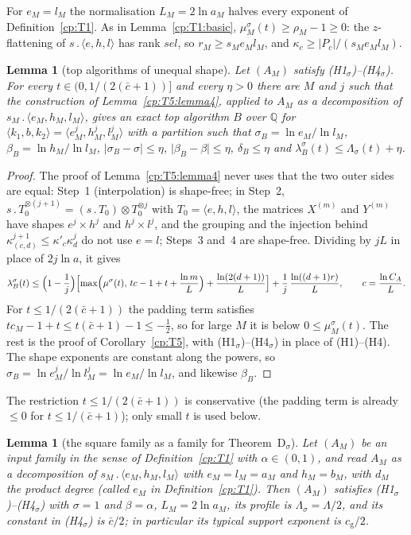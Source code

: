 \documentclass[11pt]{article}
\newtheorem{lemma}[theorem]{Lemma}
\theoremstyle{definition}
\theoremstyle{remark}
\providecommand{\Q}{\mathbb{Q}}
\newcommand{\abs}[1]{\lvert #1\rvert}
\newcommand{\mat}[3]{\langle #1,#2,#3\rangle} %
\newcommand{\cp}{\mathbin{.}}                 %
\newcommand{\delB}{\delta_B}                  %
\newcommand{\Lam}{\Lambda}                    %
\newcommand{\cg}{c_{\mathrm g}}               %
\newcommand{\cbar}{\bar c}                    %
\newcommand{\Hcond}[1]{\textup{(H#1)}}        %
\newcommand{\Hscond}[1]{\textup{(H#1$_\sigma$)}} %
\newcommand{\ThmDsig}{Theorem~D\texorpdfstring{\ensuremath{_\sigma}}{\_sigma}}   %
\begin{document}
For $e_M=l_M$ the normalisation $L_M=2\ln a_M$ halves every exponent of Definition~\ref{cp:T1}. As in Lemma~\ref{cp:T1:basic}, $\mu^\sigma_M(t)\ge\rho_M-1\ge0$: the $z$-flattening of $s\cp\mat ehl$ has rank $sel$, so $r_M\ge s_Me_Ml_M$, and $\kappa_c\ge\abs{P_c}/(s_Me_Ml_M)$.

\begin{lemma}[top algorithms of unequal shape]\label{cp:E3:top}
Let $(A_M)$ satisfy \Hscond1--\Hscond4. For every $t\in(0,1/(2(\cbar+1))]$ and every $\eta>0$ there are $M$ and $j$ such that the construction of Lemma~\ref{cp:T5:lemma4}, applied to $A_M$ as a decomposition of $s_M\cp\mat{e_M}{h_M}{l_M}$, gives an exact top algorithm $B$ over $\Q$ for $\mat{k_1}b{k_2}=\mat{e_M^j}{h_M^j}{l_M^j}$ with a partition such that $\sigma_B=\ln e_M/\ln l_M$, $\beta_B=\ln h_M/\ln l_M$, $\abs{\sigma_B-\sigma}\le\eta$, $\abs{\beta_B-\beta}\le\eta$, $\delB\le\eta$ and $\lambda^\sigma_B(t)\le\Lam_\sigma(t)+\eta$.
\end{lemma}

\begin{proof}
The proof of Lemma~\ref{cp:T5:lemma4} never uses that the two outer sides are equal: Step~1 (interpolation) is shape-free; in Step~2, $s\cp T_0^{\otimes(j+1)}=(s\cp T_0)\otimes T_0^{\otimes j}$ with $T_0=\mat ehl$, the matrices $X^{(m)}$ and $Y^{(m)}$ have shapes $e^j\times h^j$ and $h^j\times l^j$, and the grouping and the injection behind $\kappa^{j+1}_{(c,d)}\le\kappa'_c\kappa^j_d$ do not use $e=l$; Steps~3 and~4 are shape-free. Dividing by $jL$ in place of $2j\ln a$, it gives
\[
\lambda^\sigma_B(t)\le\Bigl(1-\frac1j\Bigr)\Bigl[\max\Bigl(\mu^\sigma(t),\,tc-1+t+\frac{\ln m}L\Bigr)+\frac{\ln(2(d+1))}L\Bigr]+\frac1j\,\frac{\ln((d+1)r)}L,\qquad c=\frac{\ln C_A}L .
\]
For $t\le1/(2(\cbar+1))$ the padding term satisfies $tc_M-1+t\le t(\cbar+1)-1\le-\frac12$, so for large $M$ it is below $0\le\mu^\sigma_M(t)$. The rest is the proof of Corollary~\ref{cp:T5}, with \Hscond1--\Hscond4{} in place of \Hcond1--\Hcond4. The shape exponents are constant along the powers, so $\sigma_B=\ln e_M^j/\ln l_M^j=\ln e_M/\ln l_M$, and likewise $\beta_B$.
\end{proof}

The restriction $t\le1/(2(\cbar+1))$ is conservative (the padding term is already $\le0$ for $t\le1/(\cbar+1)$); only small $t$ is used below.

\begin{lemma}[the square family as a family for \ThmDsig]\label{cp:E8:square}
Let $(A_M)$ be an input family in the sense of Definition~\ref{cp:T1} with $\alpha\in(0,1)$, and read $A_M$ as a decomposition of $s_M\cp\mat{e_M}{h_M}{l_M}$ with $e_M=l_M=a_M$ and $h_M=b_M$, with $d_M$ the product degree (called $e_M$ in Definition~\ref{cp:T1}). Then $(A_M)$ satisfies \Hscond1--\Hscond4{} with $\sigma=1$ and $\beta=\alpha$, $L_M=2\ln a_M$, its profile is $\Lam_\sigma=\Lam/2$, and its constant in \Hscond4{} is $\cbar/2$; in particular its typical support exponent is $\cg/2$.
\end{lemma}
\end{document}
